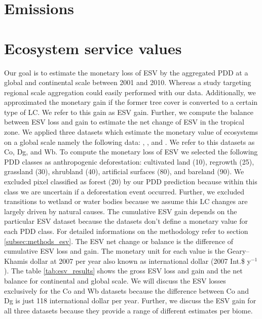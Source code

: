 	\section{Emissions}

	\section{Ecosystem service values}
		Our goal is to estimate the monetary loss of \ac{ESV} by the aggregated \ac{PDD} at a global and continental scale between 2001 and 2010. Whereas a study targeting regional scale aggregation could easily performed with our data. Additionally, we approximated the monetary gain if the former tree cover is converted to a certain type of \ac{LC}. We refer to this gain as \ac{ESV} gain. Further, we compute the balance between \ac{ESV} loss and gain to estimate the net change of \ac{ESV} in the tropical zone. We applied three datasets which estimate the monetary value of ecosystems on a global scale namely the following data: \citet{Groot2012}, \citet{Costanza2014}, and \citet{Siikamaki2015}. We refer to this datasets as Co, Dg, and Wb. To compute the monetary loss of \ac{ESV} we selected the following \ac{PDD} classes as anthropogenic deforestation: cultivated land (10), regrowth (25), grassland (30), shrubland (40), artificial surfaces (80), and bareland (90). We excluded pixel classified as forest (20) by our \ac{PDD} prediction because within this class we are uncertain if a deforestation event occurred. Further, we excluded transitions to wetland or water bodies because we assume this \ac{LC} changes are largely driven by natural causes. The cumulative \ac{ESV} gain depends on the particular \ac{ESV} dataset because the datasets don't define a monetary value for each \ac{PDD} class. For detailed informations on the methodology refer to section \ref{subsec:methods_esv}. The \ac{ESV} net change or balance is the difference of cumulative \ac{ESV} loss and gain. The monetary unit for each value is the Geary–Khamis dollar at 2007 per year also known as international dollar (2007 Int.\$ y$^{-1}$). The table \ref{tab:esv_results} shows the gross \ac{ESV} loss and gain and the net balance for continental and global scale. We will discuss the \ac{ESV} losses exclusively for the Co and Wb datasets because the difference between Co and Dg is just 118 international dollar per year. Further, we discuss the \ac{ESV} gain for all three datasets because they provide a range of different estimates per biome.

